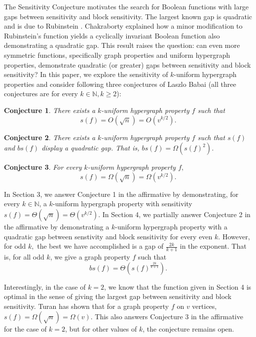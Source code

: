 \documentclass[psamsfonts]{amsart}
\newtheorem{conj}{Conjecture}
\theoremstyle{definition}
\theoremstyle{remark}
\numberwithin{equation}{section}
\begin{document}
The Sensitivity Conjecture motivates the search for Boolean functions with large gaps between sensitivity and block sensitivity. The largest known gap is quadratic and is due to Rubinstein \cite{R}. Chakraborty \cite{C} explained how a minor modification to Rubinstein's function yields a cyclically invariant Boolean function also demonstrating a quadratic gap. This result raises the question: can even more symmetric functions, specifically graph properties and uniform hypergraph properties, demonstrate quadratic (or greater) gaps between sensitivity and block sensitivity? In this paper, we explore the sensitivity of $k$-uniform hypergraph properties and consider following three conjectures of Laszlo Babai (all three conjectures are for every $k \in \mathbb{N}, k\geq 2$):

\begin{conj}
There exists a $k$-uniform hypergraph property $f$ such that $$s(f)=O(\sqrt{n})=O(v^{k/2}).$$
\end{conj}

\begin{conj}
There exists a $k$-uniform hypergraph property $f$ such that $s(f)$ and $bs(f)$ display a quadratic gap. That is,  $bs(f)=\Omega(s(f)^2)$.
\end{conj}

\begin{conj}
For every $k$-uniform hypergraph property $f,$ $$s(f)=\Omega(\sqrt{n})=\Omega(v^{k/2}).$$
\end{conj}

In Section 3, we answer Conjecture 1 in the affirmative by demonstrating, for every $k \in \mathbb{N}$, a $k$-uniform hypergraph property with sensitivity $s(f)=\Theta(\sqrt{n})=\Theta(v^{k/2})$. In Section 4, we partially answer Conjecture 2 in the affirmative by demonstrating a $k$-uniform hypergraph property with a quadratic gap between senstivity and block sensitivity for every even $k$.  However, for odd $k,$ the best we have accomplished is a gap of $\frac{2k}{k+1}$ in the exponent.  That is, for all odd $k$, we give a graph property $f$ such that 
$$bs(f)=\Theta(s(f)^{\frac{2k}{k+1}}).$$

Interestingly, in the case of $k=2$, we know that the function given in Section 4 is optimal in the sense of giving the largest gap between sensitivity and block sensitivity.  Turan \cite{T} has shown that for a graph property $f$ on $v$ vertices, $s(f) = \Omega(\sqrt{n})=\Omega(v)$. This also answers Conjecture 3 in the affirmative for the case of $k=2$, but for other values of $k$, the conjecture remains open. 
\end{document}
